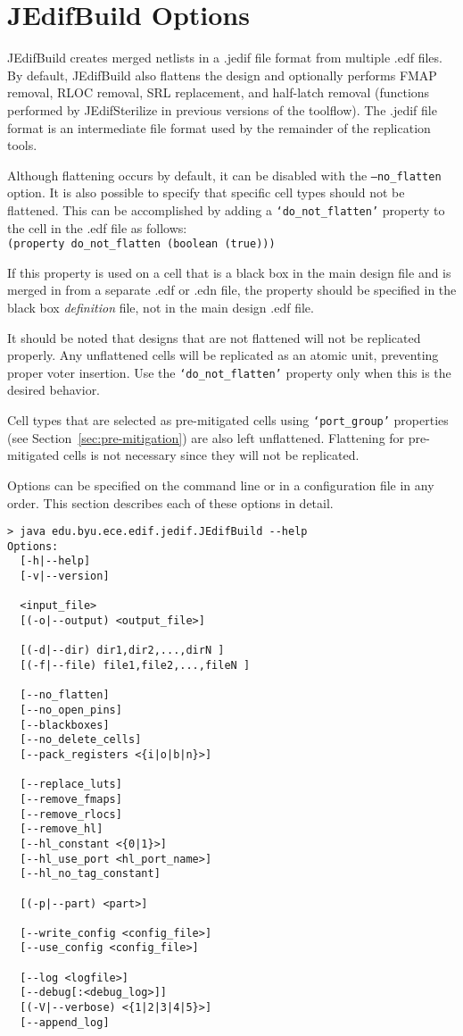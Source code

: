 \section{JEdifBuild Options}
JEdifBuild creates merged netlists in a .jedif file format from
multiple .edf files. By default, JEdifBuild also flattens the design
and optionally performs FMAP removal, RLOC removal, SRL replacement,
and half-latch removal (functions performed by JEdifSterilize in
previous versions of the toolflow). The .jedif file format is an
intermediate file format used by the remainder of the replication
tools.

Although flattening occurs by default, it can be disabled with the
\texttt{--no\_flatten} option. It is also possible to specify that specific
cell types should not be flattened. This can be accomplished by adding a
\texttt{`do\_not\_flatten'} property to the cell in the .edf file as follows:\\
\texttt{(property do\_not\_flatten (boolean (true)))}

If this property is used on a cell that is a black box in the main design file
and is merged in from a separate .edf or .edn file, the property should be
specified in the black box \emph{definition} file, not in the main design .edf
file.

It should be noted that designs that are not flattened will not be replicated
properly. Any unflattened cells will be replicated as an atomic unit,
preventing proper voter insertion. Use the \texttt{`do\_not\_flatten'} property
only when this is the desired behavior.

Cell types that are selected as pre-mitigated cells using \texttt{`port\_group'}
properties (see Section~\ref{sec:pre-mitigation}) are also left unflattened.
Flattening for pre-mitigated cells is not necessary since they will not be replicated.

Options can be specified on the command line or in a configuration file in any 
order. This section describes each of these options in detail.

\begin{verbatim}
> java edu.byu.ece.edif.jedif.JEdifBuild --help
Options:
  [-h|--help]
  [-v|--version]

  <input_file>
  [(-o|--output) <output_file>]
  
  [(-d|--dir) dir1,dir2,...,dirN ]
  [(-f|--file) file1,file2,...,fileN ]

  [--no_flatten]
  [--no_open_pins]
  [--blackboxes]
  [--no_delete_cells]
  [--pack_registers <{i|o|b|n}>]

  [--replace_luts]
  [--remove_fmaps]
  [--remove_rlocs]
  [--remove_hl]
  [--hl_constant <{0|1}>]
  [--hl_use_port <hl_port_name>]
  [--hl_no_tag_constant]

  [(-p|--part) <part>]

  [--write_config <config_file>]
  [--use_config <config_file>]

  [--log <logfile>]
  [--debug[:<debug_log>]]
  [(-V|--verbose) <{1|2|3|4|5}>]
  [--append_log]
\end{verbatim}


